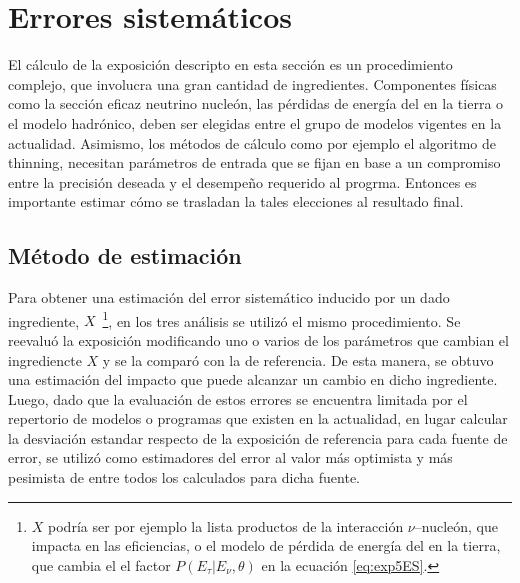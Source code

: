 \section{Errores sistem\'aticos}
\label{sc:systErr}

El cálculo de la exposición descripto en esta secci\'on es un procedimiento complejo, que involucra una gran cantidad de ingredientes. 
Componentes f\'isicas como la sección eficaz neutrino nucleón, las pérdidas de energía del \tauon{} en la tierra o el modelo hadrónico, deben ser elegidas entre el grupo de modelos vigentes en la actualidad.
Asimismo, los m\'etodos de c\'alculo como por ejemplo el algoritmo de thinning, necesitan par\'ametros de entrada que se fijan en base a un compromiso entre la precisi\'on deseada y el desempe\~no requerido al progrma.
Entonces es importante estimar c\'omo se trasladan la tales elecciones al resultado final.

	\subsection{Método de estimación}
	
	Para obtener una estimación del error sistemático inducido por un dado ingrediente, $X$~\footnote{$X$ podría ser por ejemplo la lista productos de la interacción $\nu$--nucleón, que impacta en las eficiencias, o el modelo de pérdida de energía del \tauon{} en la tierra, que cambia el el factor $P(E_\tau|E_\nu,\theta)$ en la ecuación \ref{eq:exp5ES}.}, en los tres análisis se utilizó el mismo procedimiento.
	Se reevaluó la exposición modificando uno o varios de los parámetros que cambian el ingrediencte $X$ y se la comparó con la de referencia.
	De esta manera, se obtuvo una estimación del impacto que puede alcanzar un cambio en dicho ingrediente.
	Luego, dado que la evaluación de estos errores se encuentra limitada por el repertorio de modelos o programas que existen en la actualidad, en lugar calcular la desviación estandar respecto de la exposición de referencia para cada fuente de error, se utilizó como estimadores del error al valor más optimista y más pesimista de entre todos los calculados para dicha fuente.
	
